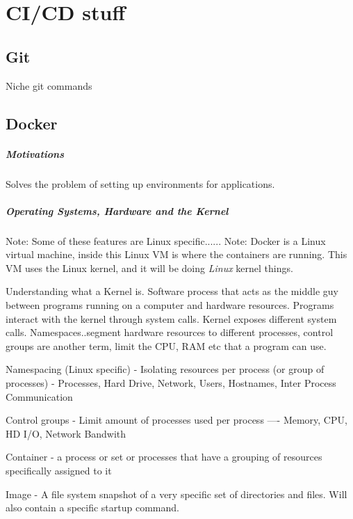 \documentclass[a4paper, 11pt]{book}
\begin{document}
    \chapter{CI/CD stuff}


    \section{Git}

    Niche git commands


    \section{Docker}

    \paragraph{Motivations}
    Solves the problem of setting up environments for applications.

    \paragraph{Operating Systems, Hardware and the Kernel}
    Note: Some of these features are Linux specific......
    Note: Docker is a Linux virtual machine, inside this Linux VM is where the containers are running.
    This VM uses the Linux kernel, and it will be doing \textit{Linux} kernel things.

    Understanding what a Kernel is.
    Software process that acts as the middle guy between programs running on a computer and hardware resources.
    Programs interact with the kernel through system calls.
    Kernel exposes different system calls.
    Namespaces..segment hardware resources to different processes, control groups are another term, limit the CPU, RAM etc that a program can use.

    Namespacing (Linux specific) - Isolating resources per process (or group of processes) - Processes, Hard Drive, Network, Users, Hostnames, Inter Process Communication

    Control groups - Limit amount of processes used per process ---- Memory, CPU, HD I/O, Network Bandwith

    Container - a process or set or processes that have a grouping of resources specifically assigned to it

    Image - A file system snapshot of a very specific set of directories and files.
    Will also contain a specific startup command.
\end{document}
